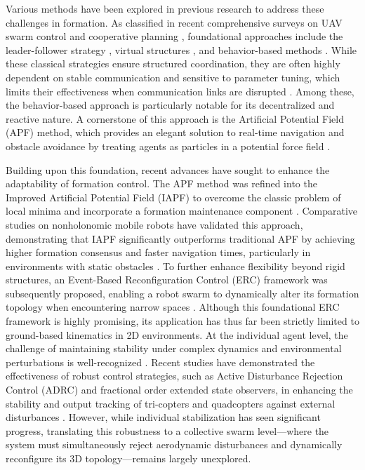 \documentclass[pdflatex,sn-basic]{sn-jnl}%
\begin{document}
    Various methods have been explored in previous research to address these challenges in formation. As classified in recent comprehensive surveys on UAV swarm control and cooperative planning \citep{li_comprehensive_2025, cetinsaya_pid_2024, rahman_survey_2025, zhang_review_2020}, foundational approaches include the leader-follower strategy \citep{e_comprehensive_2025, xu_distributed_2025}, virtual structures \citep{guo_research_2023}, and behavior-based methods \citep{pang_multi-auv_2024}. While these classical strategies ensure structured coordination, they are often highly dependent on stable communication and sensitive to parameter tuning, which limits their effectiveness when communication links are disrupted \citep{argiliana_adaptive_2025, zhu_connectivity-maintenance_2023}. Among these, the behavior-based approach is particularly notable for its decentralized and reactive nature. A cornerstone of this approach is the Artificial Potential Field (APF) method, which provides an elegant solution to real-time navigation and obstacle avoidance by treating agents as particles in a potential force field \citep{khatib_real-time_1985, kim_escaping_2025}.

    Building upon this foundation, recent advances have sought to enhance the adaptability of formation control. The APF method was refined into the Improved Artificial Potential Field (IAPF) to overcome the classic problem of local minima and incorporate a formation maintenance component \citep{wang_uav_2021}. Comparative studies on nonholonomic mobile robots have validated this approach, demonstrating that IAPF significantly outperforms traditional APF by achieving higher formation consensus and faster navigation times, particularly in environments with static obstacles \citep{prabaswara_collision-free_2025}. To further enhance flexibility beyond rigid structures, an Event-Based Reconfiguration Control (ERC) framework was subsequently proposed, enabling a robot swarm to dynamically alter its formation topology when encountering narrow spaces \citep{bui_event-based_2025}. Although this foundational ERC framework is highly promising, its application has thus far been strictly limited to ground-based kinematics in 2D environments. At the individual agent level, the challenge of maintaining stability under complex dynamics and environmental perturbations is well-recognized \citep{emran_review_2018, cheng_dynamic_2022}. Recent studies have demonstrated the effectiveness of robust control strategies, such as Active Disturbance Rejection Control (ADRC) and fractional order extended state observers, in enhancing the stability and output tracking of tri-copters and quadcopters against external disturbances \citep{hasan_fractional_2023, sekar_control_2025, najm_output_2021}. However, while individual stabilization has seen significant progress, translating this robustness to a collective swarm level—where the system must simultaneously reject aerodynamic disturbances and dynamically reconfigure its 3D topology—remains largely unexplored.
\end{document}
